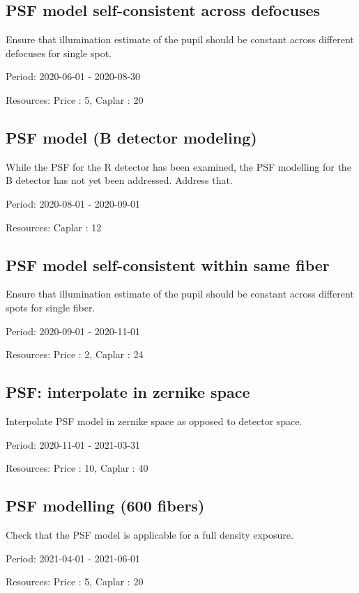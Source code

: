 \subsection{PSF model self-consistent across defocuses}

Ensure that illumination estimate of the pupil should be constant across different defocuses for single spot.

Period: 2020-06-01 - 2020-08-30

Resources: Price : 5, Caplar : 20

\subsection{PSF model (B detector modeling)}

While the PSF for the R detector has been examined, the PSF modelling for the B detector has not yet been addressed. Address that.

Period: 2020-08-01 - 2020-09-01

Resources: Caplar : 12

\subsection{PSF model self-consistent within same fiber}

Ensure that illumination estimate of the pupil should be constant across different spots for single fiber.

Period: 2020-09-01 - 2020-11-01

Resources: Price : 2, Caplar : 24

\subsection{PSF: interpolate in zernike space}

Interpolate PSF model in zernike space as opposed to detector space.

Period: 2020-11-01 - 2021-03-31

Resources: Price : 10, Caplar : 40

\subsection{PSF modelling (600 fibers)}

Check that the PSF model is applicable for a full density exposure.

Period: 2021-04-01 - 2021-06-01

Resources: Price : 5, Caplar : 20

